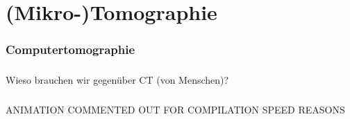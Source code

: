 \section{(Mikro-)Tomographie}
\begin{frame}
	\frametitle{Computertomographie}
	\centering
\end{frame}

\begin{frame}
	\frametitle{\uct}
	Wieso brauchen wir \uct gegenüber CT (von Menschen)?
\end{frame}

 \begin{frame}
 	\frametitle{\uct}
	ANIMATION COMMENTED OUT FOR COMPILATION SPEED REASONS
 \end{frame}

